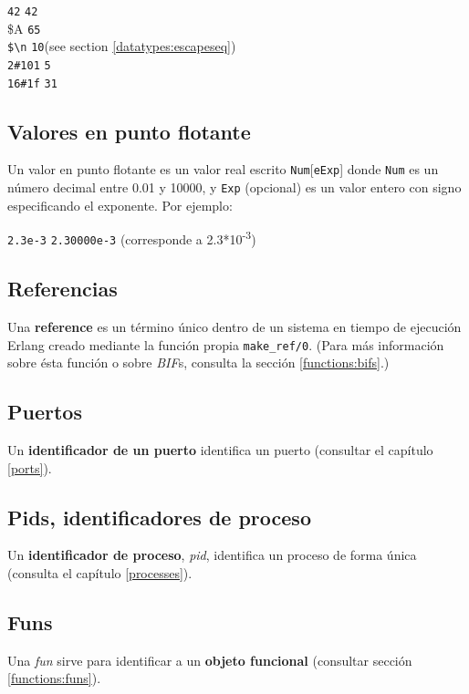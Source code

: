 \texttt{42} \resultingin \texttt{42} \\
\$A  \resultingin \texttt{65} \\
\texttt{\$\textbackslash n} \resultingin \texttt{10}\hfill(see section \ref{datatypes:escapeseq}) \\
\texttt{2\#101} \resultingin \texttt{5} \\
\texttt{16\#1f} \resultingin \texttt{31}


\subsection{Valores en punto flotante}
\label{datatypes:float}
Un valor en punto flotante es un valor real escrito \texttt{Num}[\texttt{eExp}]
donde \texttt{Num} es un n\'umero decimal entre 0.01 y 10000, y \texttt{Exp} (opcional) es un valor entero con signo especificando el exponente. Por ejemplo:

\texttt{2.3e-3} \resultingin \texttt{2.30000e-3}\hfill
(corresponde a 2.3*10\textsuperscript{-3})


\subsection{Referencias}
\label{datatypes:reference}
Una \textbf{reference} es un t\'ermino \'unico dentro de un sistema en tiempo de ejecuci\'on Erlang creado mediante la funci\'on propia \texttt{make\_ref/0}. (Para m\'as informaci\'on sobre \'esta funci\'on o sobre \textit{BIF}s, consulta la secci\'on \ref{functions:bifs}.)


\subsection{Puertos}
\label{datatypes:port}
Un \textbf{identificador de un puerto} identifica un puerto (consultar el cap\'itulo  \ref{ports}).


\subsection{Pids, identificadores de proceso}
\label{datatypes:pid}
Un \textbf{identificador de proceso}, \textit{pid}, identifica un proceso de forma \'unica (consulta el cap\'itulo \ref{processes}).


\subsection{Funs}
\label{datatypes:fun}
Una \textit{fun} sirve para identificar a un \textbf{objeto funcional} (consultar secci\'on \ref{functions:funs}).

